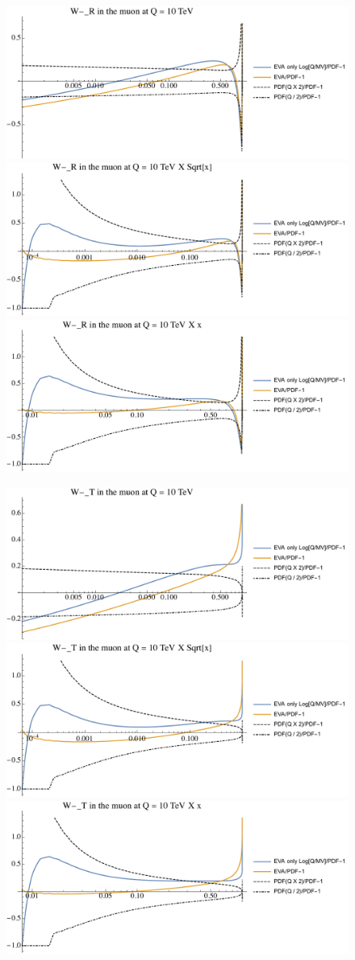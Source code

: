 \documentclass[a4paper,11pt]{article}
\begin{document}
\begin{figure}[!b]
\includegraphics[width=0.46\linewidth]{Notebooks/PlotPDFs/ratios/10TeV/W-_R_Q.pdf}
\includegraphics[width=0.46\linewidth]{Notebooks/PlotPDFs/ratios/10TeV/W-_R_Qsqrtx.pdf}
\includegraphics[width=0.46\linewidth]{Notebooks/PlotPDFs/ratios/10TeV/W-_R_Qx.pdf}
\end{figure}

\begin{figure}[!b]
\includegraphics[width=0.46\linewidth]{Notebooks/PlotPDFs/ratios/10TeV/W-_T_Q.pdf}
\includegraphics[width=0.46\linewidth]{Notebooks/PlotPDFs/ratios/10TeV/W-_T_Qsqrtx.pdf}
\includegraphics[width=0.46\linewidth]{Notebooks/PlotPDFs/ratios/10TeV/W-_T_Qx.pdf}
\end{figure}
\end{document}
